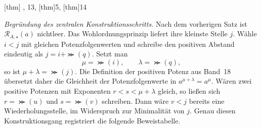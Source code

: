 \documentclass[main.tex]{subfiles}
\begin{document}
\begin{tabproofwide}
{{{        [thm]{%
          ,
          13},
        [thm]{5}},
      [thm]{14}}}
\end{tabproofwide}


\emph{Begründung des zentralen Konstruktionsschritts.}
Nach dem vorherigen Satz ist \(\mathcal R_{A,\star}(a)\) nichtleer.  Das
Wohlordnungsprinzip liefert ihre kleinste Stelle \(j\).  Wähle
\(i<j\) mit gleichen Potenzfolgenwerten und schreibe den positiven Abstand
eindeutig als \(j=i+\Succ(q)\).  Setzt man
\[
  \mu=\Succ(i),\qquad \lambda=\Succ(q),
\]
so ist \(\mu+\lambda=\Succ(j)\).  Die Definition der positiven Potenz aus
Band~18 übersetzt daher die Gleichheit der Potenzfolgenwerte in
\(a^{\mu+\lambda}=a^\mu\).  Wären zwei positive Potenzen mit Exponenten
\(r<s<\mu+\lambda\) gleich, so ließen sich
\(r=\Succ(u)\) und \(s=\Succ(v)\) schreiben.  Dann wäre
\(v<j\) bereits eine Wiederholungsstelle, im Widerspruch zur Minimalität
von \(j\).  Genau diesen Konstruktionsgang registriert die folgende
Beweistabelle.
\end{document}
